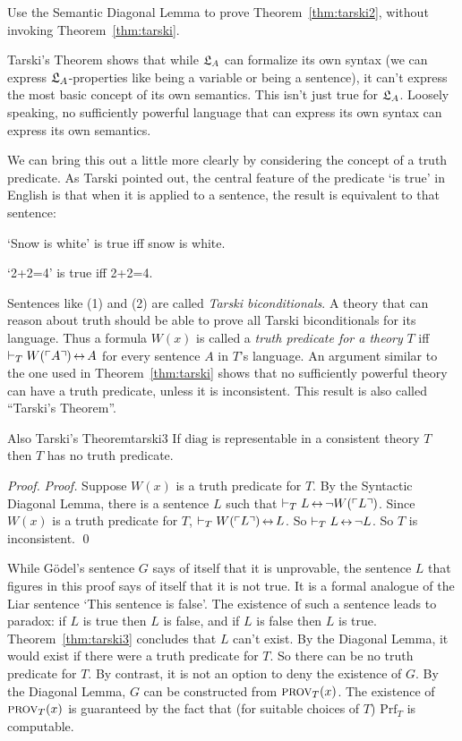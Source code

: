 \begin{exercise}
  Use the Semantic Diagonal Lemma to prove Theorem~\ref{thm:tarski2},
  without invoking Theorem~\ref{thm:tarski}.
\end{exercise}

Tarski's Theorem shows that while
$\mathfrak{L}_A$ can formalize its own syntax
(we can express $\mathfrak{L}_A$-properties like being a variable or being a sentence),
it can't express the most basic concept of its own semantics.
This isn't just true for $\mathfrak{L}_A$.
Loosely speaking,
no sufficiently powerful language that can express its own syntax
can express its own semantics.

We can bring this out a little more clearly by considering the concept of a truth predicate.
As Tarski pointed out,
the central feature of the predicate `is true' in English is that
when it is applied to a sentence,
the result is equivalent to that sentence:
\begin{cenumerate}
  \item[(1)] `Snow is white' is true iff snow is white.
  \item[(2)] `2+2=4' is true iff 2+2=4.
\end{cenumerate}
Sentences like (1) and (2) are called \emph{Tarski biconditionals}.
A theory that can reason about truth
should be able to prove all Tarski biconditionals for its language.
Thus a formula $W(x)$ is called a \emph{truth predicate for a theory} $T$
iff $\proves_T W(\gn{A}) \leftrightarrow A$
for every sentence $A$ in $T$'s language.
An argument similar to the one used in Theorem~\ref{thm:tarski}
shows that no sufficiently powerful theory can have a truth predicate,
unless it is inconsistent.
This result is also called ``Tarski's Theorem''.

\begin{theorem}{Also Tarski's Theorem}{tarski3}
  If $\mathrm{diag}$ is representable in a consistent theory $T$
  then $T$ has no truth predicate.
\end{theorem}
\begin{proof}
  \emph{Proof.}
  Suppose $W(x)$ is a truth predicate for $T$.
  By the Syntactic Diagonal Lemma,
  there is a sentence $L$ such that $\proves_T L \leftrightarrow \neg W(\gn{L})$.
  Since $W(x)$ is a truth predicate for $T$,
  $\proves_T W(\gn{L}) \leftrightarrow L$.
  So $\proves_T L \leftrightarrow \neg L$.
  So $T$ is inconsistent. \qed
\end{proof}

While Gödel's sentence $G$ says of itself that it is unprovable,
the sentence $L$ that figures in this proof says of itself that it is not true.
It is a formal analogue of the Liar sentence `This sentence is false'.
The existence of such a sentence leads to paradox:
if $L$ is true then $L$ is false,
and if $L$ is false then $L$ is true.
Theorem~\ref{thm:tarski3} concludes that $L$ can't exist.
By the Diagonal Lemma,
it would exist if there were a truth predicate for $T$.
So there can be no truth predicate for $T$.
By contrast,
it is not an option to deny the existence of $G$.
By the Diagonal Lemma,
$G$ can be constructed from $\smallcaps{Prov}_T(x)$.
The existence of $\smallcaps{Prov}_T(x)$ is
guaranteed by the fact that (for suitable choices of $T$) $\mathrm{Prf}_T$ is computable.

